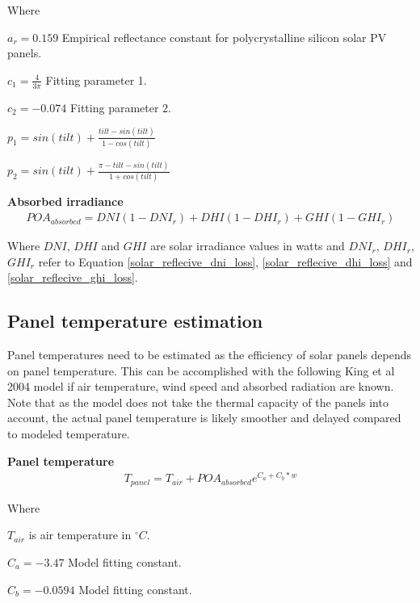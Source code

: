 \noindent Where

$a_r = 0.159$ Empirical reflectance constant for polycrystalline silicon solar PV panels.

$c_1= \frac{4}{3\pi}$  Fitting parameter 1.

$c_2 = -0.074$ Fitting parameter 2.

$p_1= sin(tilt) + \frac{tilt-sin(tilt)}{1-cos(tilt)}$

$p_2= sin(tilt) + \frac{\pi - tilt-sin(tilt)}{1+cos(tilt)}$


\noindent\textbf{Absorbed irradiance}
\begin{equation}
\begin{split}
\label{solar_reflecive_absorbed}
POA_{absorbed} = DNI(1-DNI_{r})+ DHI(1-DHI_{r})+GHI(1-GHI_{r})
\end{split}
\end{equation}

\noindent Where $DNI$, $DHI$ and $GHI$ are solar irradiance values in watts and $DNI_r$, $DHI_r$, $GHI_r$ refer to Equation \ref{solar_reflecive_dni_loss}, \ref{solar_reflecive_dhi_loss} and \ref{solar_reflecive_ghi_loss}.





\subsection{Panel temperature estimation}
Panel temperatures need to be estimated as the efficiency of solar panels depends on panel temperature. This can be accomplished with the following King et al 2004 model\cite{king2004} if air temperature, wind speed and absorbed radiation are known. Note that as the model does not take the thermal capacity of the panels into account, the actual panel temperature is likely smoother and delayed compared to modeled temperature.

\noindent\textbf{Panel temperature}
\begin{equation}
\begin{split}
\label{panel_temp}
T_{panel} = T_{air} + POA_{absorbed} e ^{C_a+ C_b*w}
\end{split}
\end{equation}

\noindent Where 

$T_{air}$ is air temperature in $^\circ C$.

$C_a = -3.47$ Model fitting constant.

$C_b = -0.0594$ Model fitting constant. 

